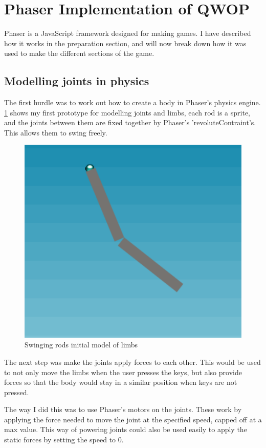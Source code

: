\documentclass[12pt,a4paper,twoside,openright]{report}
\begin{document}
\section{Phaser Implementation of QWOP}
\label{sec:qwopImp}
Phaser is a JavaScript framework designed for making games. I have described how it works in the preparation section, and will now break down how it was used to make the different sections of the game.


\subsection{Modelling joints in physics }
\label{sec:jointsInPhysics}
The first hurdle was to work out how to create a body in Phaser's physics engine.   
\ref{swingingRods} shows my first prototype for modelling joints and limbs, each rod is a sprite, and the joints between them are fixed together by Phaser's 'revoluteContraint's. This allows them to swing freely.

\begin{figure}[tbh]
\centerline{\includegraphics[scale=0.5]{swingingRods.PNG}}
\caption{Swinging rods initial model of limbs}
\label{swingingRods}
\end{figure}

The next step was make the joints apply forces to each other. This would be used to not only move the limbs when the user presses the keys, but also provide forces so that the body would stay in a similar position when keys are not pressed.

The way I did this was to use Phaser's motors on the joints. These work by applying the force needed to move the joint at the specified speed, capped off at a max value. This way of powering joints could also be used easily to apply the static forces by setting the speed to 0.
\end{document}

